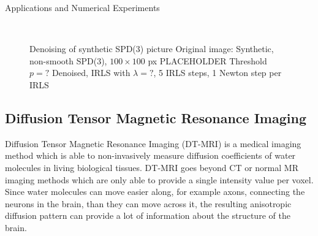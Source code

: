 \begin{chapter}{Applications and Numerical Experiments}
\begin{figure}[h!]
{    }
    \\
    \caption[Denoising of synthetic SPD(3) picture]{Denoising of synthetic SPD(3) picture
	 Original image: Synthetic, non-smooth SPD(3), $100\times 100$ px PLACEHOLDER
	 Threshold $p=?$
	 Denoised, IRLS with $\lambda=?$, 5 IRLS steps, 1 Newton step per IRLS
	\label{fig:application_spd1}
    }
\end{figure}


\FloatBarrier
\subsection{Diffusion Tensor Magnetic Resonance Imaging} %
\label{sub:Diffusion Tensor MRI images}
Diffusion Tensor Magnetic Resonance Imaging (DT-MRI) is a medical imaging method which is able to non-invasively measure diffusion coefficients of water molecules
in living biological tissues. DT-MRI goes beyond CT or normal MR imaging methods which are only able to provide a single intensity value per voxel. Since water molecules
can move easier along, for example axons, connecting the neurons in the brain, than they can move across it, the resulting anisotropic diffusion pattern can provide a
lot of information about the structure of the brain.\\


\end{chapter}
